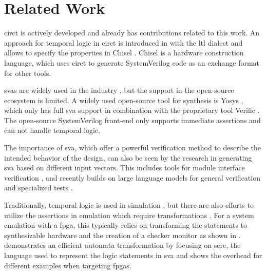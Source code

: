 \documentclass[11pt,DIV=16,parskip=half]{scrartcl}
\begin{document}
\section{Related Work}


\gls{circt} is actively developed and already has contributions related to this work.
An approach for temporal logic \cite{pnueliTemporalLogicPrograms1977} in \gls{circt}
is introduced in \cite{dobisFormalVerificationHardware2024} with the \gls{ltl}
dialect and allows to specify the properties in Chisel
\cite{bachrachChiselConstructingHardware2012}.
Chisel is a hardware construction language, which uses \gls{circt} to generate
SystemVerilog \cite{IEEEStandardSystemVerilog2024} code as an exchange format
for other tools.

\glspl{sva} are widely used in the industry
\cite{witharanaSurveyAssertionbasedHardware2022}, but the support in the
open-source ecosystem is limited.
A widely used open-source tool for synthesis is Yosys \cite{yosys}, which only
has full \gls{sva} support in combination with the proprietary
tool Verific \cite{verific2025}.
The open-source SystemVerilog front-end only supports immediate assertions and
can not handle temporal logic.

The importance of \gls{sva}, which offer a powerful verification
method to describe the intended behavior of the design, can also be seen by the
research in generating \gls{sva} based on different input
vectors.
This includes tools for module interface verification
\cite{orenes-veraAutoSVADemocratizingFormal2021}, and recently builds on large
language models for general verification
\cite{keszoczeChatbotbasedAssertionGeneration2019,
sunImprovingVerificationProductivity2023} and specialized tests
\cite{kandeSecurityAssertionsLarge2024}.

Traditionally, temporal logic is used in simulation
\cite{habibiExtensionSystemCSystemVerilog2004, dahanCombiningSystemLevel2005},
but there are also efforts to utilize the assertions in emulation which require
transformations \cite{cimattiSymbolicCompilationPSL2008,
ehlersSymbolicBoundedSynthesis2010, noureddineSynthesisSequentialExtended2014}.
For a system emulation with a \gls{fpga}, this typically relies on transforming
the statements to synthesizable hardware and the creation of a checker monitor
as shown in \cite{kastelanSynthesizableSystemVerilogAssertions2009}.
\cite{bouleEfficientAutomataBasedAssertionChecker2007} demonstrates an
efficient automata transformation by focusing on \gls{sere}, the language used to
represent the logic statements in \gls{sva} and shows the
overhead for different examples when targeting \glspl{fpga}.
\end{document}
